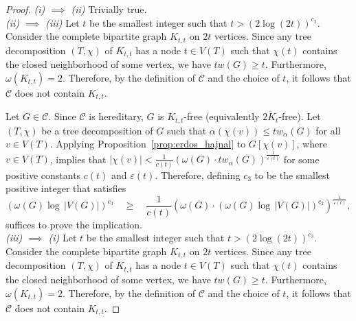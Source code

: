 \documentclass[11pt]{amsart}
\newcommand{\tw}{tw\xspace}
\newcommand{\atw}{tw_{\alpha}\xspace}
\begin{document}
\begin{proof}

    {\em (i) $\implies$ (ii)} \quad Trivially true.\\[-8pt]
    
    {\em (ii) $\implies$ (iii)} \quad Let $t$ be the smallest integer such that $t > (2 \log(2t))^{c_2}$. Consider the complete bipartite graph $K_{t,t}$ on $2t$ vertices. Since any tree decomposition $(T,\chi)$ of $K_{t,t}$ has a node $t\in V(T)$ such that $\chi(t)$ contains the closed neighborhood of some vertex, we have $\tw(G)\geq t$. Furthermore, $\omega(K_{t,t}) = 2$. Therefore, by the definition of $\mathcal{C}$ and the choice of $t$, it follows that $\mathcal{C}$ does not contain $K_{t,t}$. 
    
    Let $G \in \mathcal{C}$. Since $\mathcal{C}$ is hereditary, $G$ is  $K_{t,t}$-free (equivalently $\overline{2K_t}$-free). Let $(T, \chi)$ be a tree decomposition of $G$ such that $\alpha(\chi(v)) \leq \atw(G)$ for all $v \in V(T)$. Applying Proposition~\ref{prop:erdos_hajnal} to $G[\chi(v)]$, where $v\in V(T)$, implies that $|\chi(v)| < \frac{1}{c(t)}(\omega(G)\cdot \atw(G))^{\frac{1}{\varepsilon(t)}}$ for some positive constants $c(t)$ and $\varepsilon(t)$. Therefore, defining $c_3$ to be the smallest positive integer that satisfies 
    $$
    (\omega(G) \log\, |V(G)|)^{c_3} \quad 
    \geq \quad 
    \frac{1}{c(t)}(\omega(G)\cdot (\omega(G) \log\, |V(G)|)^{c_2})^{\frac{1}{\varepsilon(t)}},
    $$ 
    suffices to prove the implication.\\[-8pt]
    
    {\em (iii) $\implies$ (i)} \quad Let $t$ be the smallest integer such that $t > (2 \log(2t))^{c_3}$. Consider the complete bipartite graph $K_{t,t}$ on $2t$ vertices. Since any tree decomposition $(T,\chi)$ of $K_{t,t}$ has a node $t\in V(T)$ such that $\chi(t)$ contains the closed neighborhood of some vertex, we have $\tw(G)\geq t$. Furthermore, $\omega(K_{t,t}) = 2$. Therefore, by the definition of $\mathcal{C}$ and the choice of $t$, it follows that $\mathcal{C}$ does not contain $K_{t,t}$. 
    

\end{proof}
\end{document}
